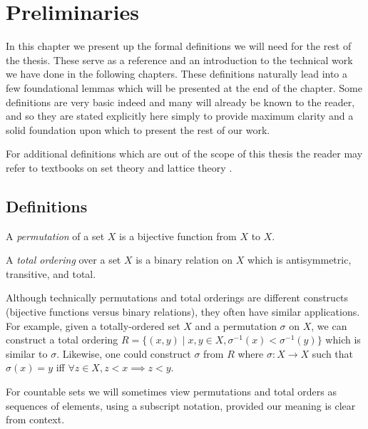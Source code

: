 
\chapter{Preliminaries}

	In this chapter we present up the formal definitions we will need for the rest of the thesis. These serve as a reference and an introduction to the technical work we have done in the following chapters. These definitions naturally lead into a few foundational lemmas which will be presented at the end of the chapter. Some definitions are very basic indeed and many will already be known to the reader, and so they are stated explicitly here simply to provide maximum clarity and a solid foundation upon which to present the rest of our work.

	For additional definitions which are out of the scope of this thesis the reader may refer to textbooks on set theory \cite{kunen1980set} and lattice theory \cite{birkhoff1995lattice}.

\section{Definitions}

	\begin{definition}
		A \emph{permutation} of a set $X$ is a bijective function from $X$ to $X$.
	\end{definition}

	\begin{definition}
		A \emph{total ordering} over a set $X$ is a binary relation on $X$ which is antisymmetric, transitive, and total.
	\end{definition}

	Although technically permutations and total orderings are different constructs (bijective functions versus binary relations), they often have similar applications. For example, given a totally-ordered set $X$ and a permutation $\sigma$ on $X$, we can construct a total ordering $R = \{(x,y) \mid x, y \in X, \sigma^{-1}(x) < \sigma^{-1}(y)\}$ which is similar to $\sigma$. Likewise, one could construct $\sigma$ from $R$ where $\sigma : X \to X$ such that $\sigma(x) = y$ iff $\forall z \in X, z < x \implies z < y$.

	For countable sets we will sometimes view permutations and total orders as sequences of elements, using a subscript notation, provided our meaning is clear from context.

